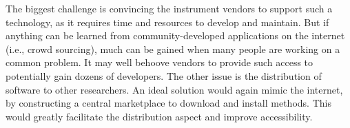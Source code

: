 The biggest challenge is convincing the instrument vendors to support such a technology, as it requires time and resources to develop and maintain. But if anything can be learned from community-developed applications on the internet (i.e., crowd sourcing), much can be gained when many people are working on a common problem. It may well behoove vendors to provide such access to potentially gain dozens of developers. The other issue is the distribution of software to other researchers. An ideal solution would again mimic the internet, by constructing a central marketplace to download and install methods. This would greatly facilitate the distribution aspect and improve accessibility.

